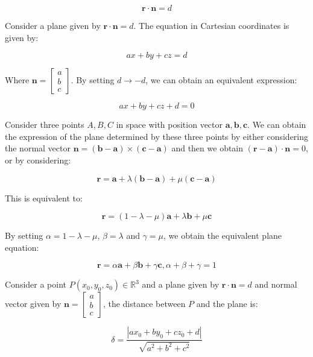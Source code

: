 \documentclass[12pt]{article}
\begin{document}
\[ \mathbf{r \cdot n} = d \]

\begin{proposition}
    Consider a plane given by $\mathbf{r \cdot n} = d$. The equation in Cartesian coordinates is given by:

    \[ ax + by + cz = d \]

    Where $\mathbf{n} = \begin{bmatrix}
        a \\
        b \\
        c
    \end{bmatrix}$. By setting $d \to -d$, we can obtain an equivalent expression:

    \[ ax + by + cz + d = 0 \]
\end{proposition}

\begin{proposition}
    Consider three points $A, B, C$ in space with position vector $\mathbf{a, b, c}$. We can obtain the expression of the plane determined by these three points by either considering the normal vector $\mathbf{n} = (\mathbf{b - a}) \times (\mathbf{c - a})$ and then we obtain $\mathbf{(r - a)\cdot n} = 0$, or by considering:

    \[ \mathbf{r} = \mathbf{a} + \lambda\mathbf{(b - a)} + \mu\mathbf{(c - a)} \]

    This is equivalent to:

    \[ \mathbf{r} = (1 - \lambda - \mu)\mathbf{a} + \lambda\mathbf{b} + \mu\mathbf{c} \]

    By setting $\alpha = 1 - \lambda - \mu$, $\beta = \lambda$ and $\gamma = \mu$, we obtain the equivalent plane equation:

    \[ \mathbf{r} = \alpha\mathbf{a} + \beta\mathbf{b} + \gamma\mathbf{c}, \alpha + \beta + \gamma = 1 \]
\end{proposition}

\begin{proposition}
    Consider a point $P(x_0, y_0, z_0) \in \mathbb{R}^3$ and a plane given by $\mathbf{r \cdot n} = d$ and normal vector given by $\mathbf{n} = \begin{bmatrix}
        a \\
        b \\
        c
    \end{bmatrix}$, the distance between $P$ and the plane is:

    \[ \delta = \frac{|ax_0 + by_0 + cz_0 + d|}{\sqrt{a^2 + b^2 + c^2}} \]
\end{proposition}
\end{document}
